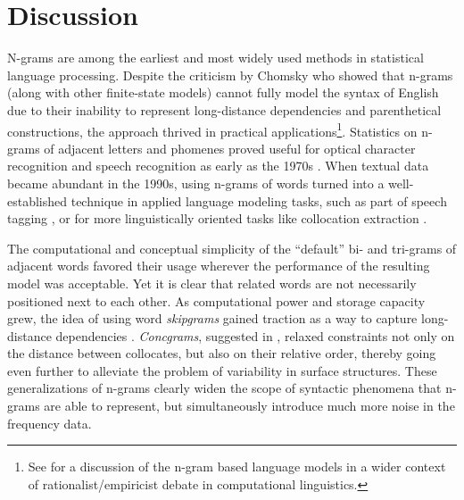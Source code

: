 \documentclass[12pt]{article}
\begin{document}



\section{Discussion}
\label{sec:discuss}

N-grams are among the earliest and most widely used methods in
statistical language processing.  Despite the criticism by Chomsky
\autocite{chomsky1956three} who showed that n-grams (along with other
finite-state models) cannot fully model the syntax of English due to
their inability to represent long-distance dependencies and
parenthetical constructions, the approach thrived in practical
applications\footnote{See \textcite{church2011pendulum} for a
  discussion of the n-gram based language models in a wider context of
  rationalist/empiricist debate in computational
  linguistics.}. Statistics on n-grams of adjacent letters and
phomenes proved useful for optical character recognition and speech
recognition as early as the 1970s
\autocite{robertson1998applications}. When textual data became
abundant in the 1990s, using n-grams of words turned into a
well-established technique in applied language modeling tasks, such as
part of speech tagging \autocite{brants2000tnt}, or for more
linguistically oriented tasks like collocation extraction
\autocite{manning1999foundations}.


The computational and conceptual simplicity of the “default” bi- and
tri-grams of adjacent words favored their usage wherever the
performance of the resulting model was acceptable. Yet it is clear
that related words are not necessarily positioned next to each
other. As computational power and storage capacity grew, the idea of
using word \textit{skipgrams} gained traction as a way to capture
long-distance dependencies
\autocite{guthrie-etal-2006-closer}. \textit{Concgrams}, suggested in
\cite{cheng2006concgrams}, relaxed constraints not only on the
distance between collocates, but also on their relative order, thereby
going even further to alleviate the problem of variability in surface
structures. These generalizations of n-grams clearly widen the scope
of syntactic phenomena that n-grams are able to represent, but
simultaneously introduce much more noise in the frequency data.
\end{document}
